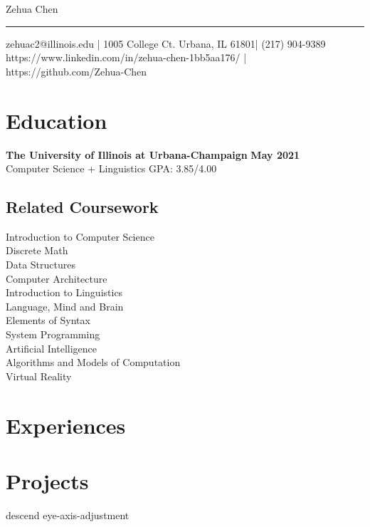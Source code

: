 \documentclass[10pt, letterpaper]{article}
\begin{document}
  \begin{center}
    {\LARGE Zehua Chen} \\
    \rule{\textwidth}{1pt}
    zehuac2@illinois.edu | 1005 College Ct. Urbana, IL 61801| (217) 904-9389 \\
    https://www.linkedin.com/in/zehua-chen-1bb5aa176/ | https://github.com/Zehua-Chen
  \end{center}

  \section{Education}
  {\large\textbf{The University of Illinois at Urbana-Champaign}} \hfill {\large\textbf{May 2021}} \\
  {Computer Science + Linguistics} \hfill {GPA: 3.85/4.00}

  \subsection{Related Coursework}

  \vspace{0pt}

  \begin{multicols}{3}
    Introduction to Computer Science \\
    Discrete Math \\
    Data Structures \\
    Computer Architecture \\
    Introduction to Linguistics \\
    Language, Mind and Brain \\
    Elements of Syntax \\
    System Programming \\
    Artificial Intelligence \\
    Algorithms and Models of Computation \\
    Virtual Reality
  \end{multicols}

  \section{Experiences}
  
  
  
  

  \section{Projects}
  {descend}
  {eye-axis-adjustment}
\end{document}
